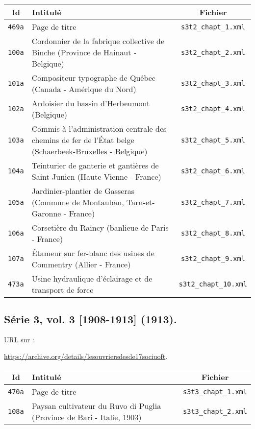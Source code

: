 \begin{center}
\begin{longtable}{ | c | p{9.5cm} | c | }
\hline
Id & Intitulé & Fichier \\ \hline
\texttt{469a} & Page de titre & \texttt{s3t2\_chapt\_1.xml} \\ \hline
\texttt{100a} & Cordonnier de la fabrique collective de Binche (Province de Hainaut - Belgique) & \texttt{s3t2\_chapt\_2.xml} \\ \hline
\texttt{101a} & Compositeur typographe de Québec (Canada - Amérique du Nord) & \texttt{s3t2\_chapt\_3.xml} \\ \hline
\texttt{102a} & Ardoisier du bassin d'Herbeumont (Belgique) & \texttt{s3t2\_chapt\_4.xml} \\ \hline
\texttt{103a} & Commis à l'administration centrale des chemins de fer de l'État belge (Schaerbeek-Bruxelles - Belgique) & \texttt{s3t2\_chapt\_5.xml} \\ \hline
\texttt{104a} & Teinturier de ganterie et gantières de Saint-Junien (Haute-Vienne - France) & \texttt{s3t2\_chapt\_6.xml} \\ \hline
\texttt{105a} & Jardinier-plantier de Gasseras (Commune de Montauban, Tarn-et-Garonne - France) & \texttt{s3t2\_chapt\_7.xml} \\ \hline
\texttt{106a} & Corsetière du Raincy (banlieue de Paris - France) & \texttt{s3t2\_chapt\_8.xml} \\ \hline
\texttt{107a} & Étameur sur fer-blanc des usines de Commentry (Allier - France) & \texttt{s3t2\_chapt\_9.xml} \\ \hline
\texttt{473a} & Usine hydraulique d'éclairage et de transport de force & \texttt{s3t2\_chapt\_10.xml} \\ \hline
\end{longtable}
\end{center}

\subsection{Série 3, vol. 3 [1908-1913] (1913).}
\label{mappings3t3}

URL sur \ia{} : 

\url{https://archive.org/details/lesouvriersdesde17sociuoft}.

\begin{center}
\begin{longtable}{ | c | p{9.5cm} | c | }
\hline
Id & Intitulé & Fichier \\ \hline
\texttt{470a} & Page de titre & \texttt{s3t3\_chapt\_1.xml} \\ \hline
\texttt{108a} & Paysan cultivateur du Ruvo di Puglia (Province de Bari - Italie, 1903) & \texttt{s3t3\_chapt\_2.xml} \\ \hline
\end{longtable}
\end{center}

